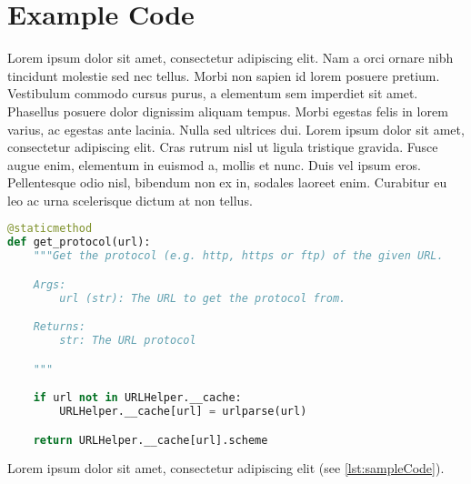 \chapter{Example Code}

Lorem ipsum dolor sit amet, consectetur adipiscing elit. Nam a orci ornare nibh tincidunt molestie sed nec tellus. Morbi non sapien id lorem posuere pretium. Vestibulum commodo cursus purus, a elementum sem imperdiet sit amet. Phasellus posuere dolor dignissim aliquam tempus. Morbi egestas felis in lorem varius, ac egestas ante lacinia. Nulla sed ultrices dui. Lorem ipsum dolor sit amet, consectetur adipiscing elit. Cras rutrum nisl ut ligula tristique gravida. Fusce augue enim, elementum in euismod a, mollis et nunc. Duis vel ipsum eros. Pellentesque odio nisl, bibendum non ex in, sodales laoreet enim. Curabitur eu leo ac urna scelerisque dictum at non tellus.

\begin{lstlisting}[caption={A sample Python method},label={lst:sampleCode},language=python]
@staticmethod
def get_protocol(url):
    """Get the protocol (e.g. http, https or ftp) of the given URL.

    Args:
        url (str): The URL to get the protocol from.

    Returns:
        str: The URL protocol

    """

    if url not in URLHelper.__cache:
        URLHelper.__cache[url] = urlparse(url)

    return URLHelper.__cache[url].scheme
\end{lstlisting}

Lorem ipsum dolor sit amet, consectetur adipiscing elit (see \ref{lst:sampleCode}).